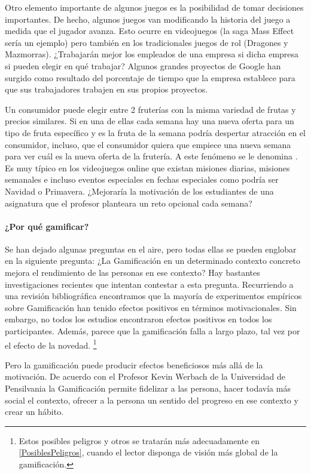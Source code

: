 Otro elemento importante de algunos juegos es la posibilidad de tomar decisiones importantes.
%
De hecho, algunos juegos van modificando la historia del juego a medida que el jugador avanza. 
%
Esto ocurre en videojuegos (la saga Mass Effect sería un ejemplo) pero también en los tradicionales juegos de rol (Dragones y Mazmorras).
%
¿Trabajarán mejor los empleados de una empresa si dicha empresa si pueden elegir en qué trabajar?
%
Algunos grandes proyectos de Google han surgido como resultado del porcentaje de tiempo que la empresa establece para que sus trabajadores trabajen en sus propios proyectos.

Un consumidor puede elegir entre 2 fruterías con la misma variedad de frutas y precios similares.
%
Si en una de ellas cada semana hay una nueva oferta para un tipo de fruta específico y es la fruta de la semana podría despertar atracción en el consumidor, incluso, que el consumidor quiera que empiece una nueva semana para ver cuál es la nueva oferta de la frutería.
%
A este fenómeno se le denomina . 
%
Es muy típico en los videojuegos online que existan misiones diarias, misiones semanales e incluso eventos especiales en fechas especiales como podría ser Navidad o Primavera.
%
¿Mejoraría la motivación de los estudiantes de una asignatura que el profesor planteara un reto opcional cada semana?



\paragraph{¿Por qué gamificar?} Se han dejado algunas preguntas en el aire, pero todas ellas se pueden englobar en la siguiente pregunta: ¿La Gamificación en un determinado contexto concreto mejora el rendimiento de las personas en ese contexto?
%
Hay bastantes investigaciones recientes que intentan contestar a esta pregunta.
%
Recurriendo a una revisión bibliográfica \cite{EmpiricalGamification} encontramos que la mayoría de experimentos empíricos sobre Gamificación han tenido efectos positivos en términos motivacionales.
%
Sin embargo, no todos los estudios encontraron efectos positivos en todos los participantes.
%
Además, parece que la gamificación falla a largo plazo, tal vez por el efecto de la novedad. 
%
\footnote{Estos posibles peligros y otros se tratarán más adecuadamente en \ref{PosiblesPeligros}, cuando el lector disponga de visión más global de la gamificación.}

Pero la gamificación puede producir efectos beneficiosos más allá de la motivación.
% 
De acuerdo con el Profesor Kevin Werbach de la Universidad de Pensilvania la Gamificación permite fidelizar a las persona, hacer todavía más social el contexto, ofrecer a la persona un sentido del progreso en ese contexto y crear un hábito.


